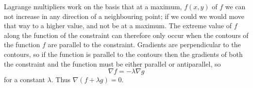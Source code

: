 Lagrange multipliers work on the basis that at a maximum, $f(x,y)$ of
$f$ we can not increase in any direction of a neighbouring point; if
we could we would move that way to a higher value, and not be at a
maximum. The extreme value of $f$ along the function of the constraint
can therefore only occur when the contours of the function $f$ are
parallel to the constraint. Gradients are perpendicular to the
contours, so if the function is parallel to the contours then the
gradients of both the constraint and the function must be either
parallel or antiparallel, so
\[ \nabla f = - \lambda \nabla g \] for a constant $\lambda$. Thus
$\nabla(f + \lambda g)=0$.


